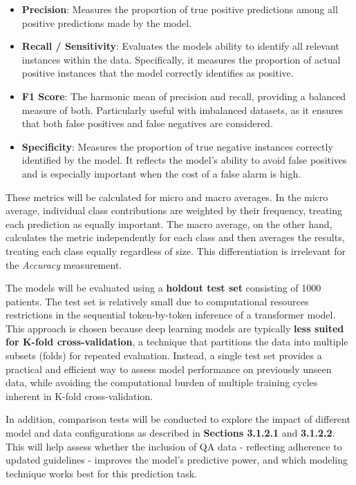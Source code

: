 \documentclass[
]{article}
\begin{document}
\begin{itemize}
\item
  \textbf{Precision}: Measures the proportion of true positive
  predictions among all positive predictions made by the model.
\item
  \textbf{Recall / Sensitivity}: Evaluates the model\textquotesingle s
  ability to identify all relevant instances within the data.
  Specifically, it measures the proportion of actual positive instances
  that the model correctly identifies as positive.
\item
  \textbf{F1 Score}: The harmonic mean of precision and recall,
  providing a balanced measure of both. Particularly useful with
  imbalanced datasets, as it ensures that both false positives and false
  negatives are considered.
\item
  \textbf{Specificity}: Measures the proportion of true negative
  instances correctly identified by the model. It reflects the model's
  ability to avoid false positives and is especially important when the
  cost of a false alarm is high.
\end{itemize}

These metrics will be calculated for micro and macro averages. In the
micro average, individual class contributions are weighted by their
frequency, treating each prediction as equally important. The macro
average, on the other hand, calculates the metric independently for each
class and then averages the results, treating each class equally
regardless of size. This differentiation is irrelevant for the
\emph{Accuracy} measurement.

The models will be evaluated using a \textbf{holdout test set}
consisting of 1000 patients. The test set is relatively small due to
computational resources restrictions in the sequential token-by-token
inference of a transformer model. This approach is chosen because deep
learning models are typically \textbf{less suited for K-fold
cross-validation}, a technique that partitions the data into multiple
subsets (folds) for repeated evaluation. Instead, a single test set
provides a practical and efficient way to assess model performance on
previously unseen data, while avoiding the computational burden of
multiple training cycles inherent in K-fold cross-validation.

In addition, comparison tests will be conducted to explore the impact of
different model and data configurations as described in \textbf{Sections
3.1.2.1} and \textbf{3.1.2.2}. This will help assess whether the
inclusion of QA data - reflecting adherence to updated guidelines -
improves the model's predictive power, and which modeling technique
works best for this prediction task.
\end{document}
